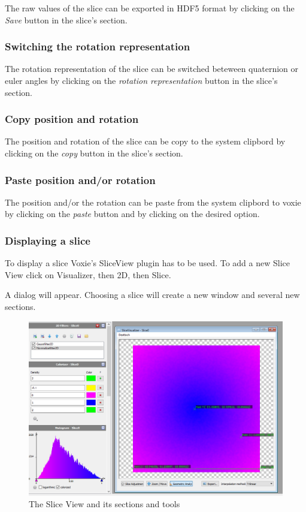 The raw values of the slice can be exported in HDF5 format by clicking on the \textit{Save} button in the slice's section.

\subsubsection{Switching the rotation representation}

The rotation representation of the slice can be switched beteween quaternion or euler angles by clicking on the \textit{rotation representation} button in the slice's section.

\subsubsection{Copy position and rotation}

The position and rotation of the slice can be copy to the system clipbord by clicking on the \textit{copy} button in the slice's section.

\subsubsection{Paste position and/or rotation}

The position and/or the rotation can be paste from the system clipbord to voxie by clicking on the \textit{paste} button and by clicking on the desired option.

\subsubsection{Displaying a slice}

To display a slice Voxie's SliceView plugin has to be used. To add a new Slice View click on Visualizer, then 2D, then Slice.

A dialog will appear. Choosing a slice will create a new window and several new sections.

\begin{figure}[h]
  \centering
  \includegraphics[width=1.0\textwidth]{img/2d/sliceview.png}
  \caption{The Slice View and its sections and tools}
\end{figure}


